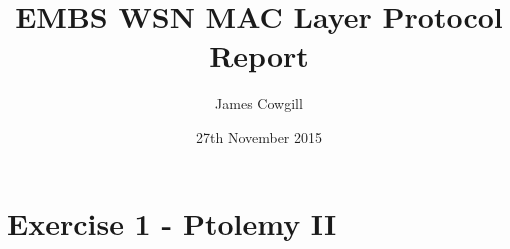 \documentclass[a4paper,12pt,DIV=calc]{scrartcl}
\begin{document}

\title{EMBS WSN MAC Layer Protocol Report}

\author{James Cowgill}

\date{27th November 2015}

\maketitle











%









\section{Exercise 1 - Ptolemy II}
\end{document}
